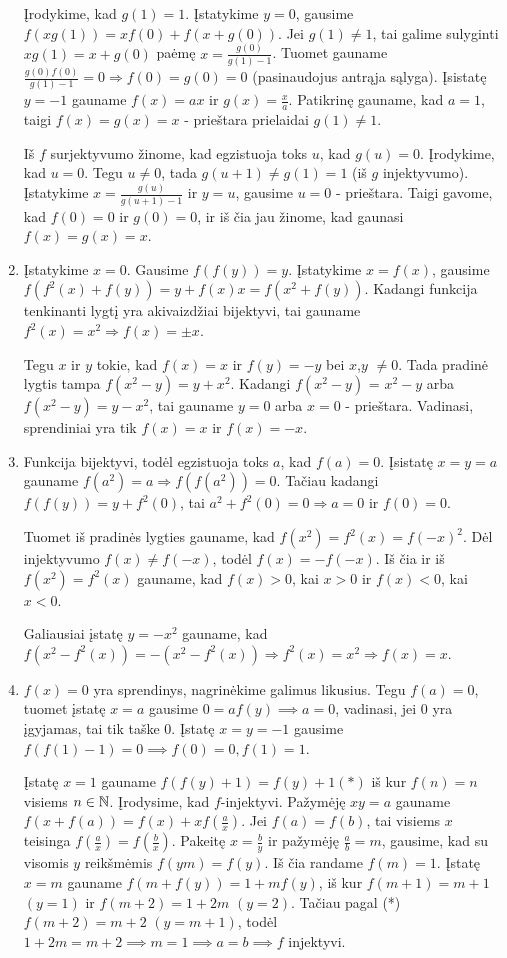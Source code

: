 \begin{enumerate}
Įrodykime, kad $g(1)=1$. Įstatykime $y = 0$, gausime $f(xg(1)) = xf(0)
+ f(x + g(0))$. Jei $g(1)\neq 1$, tai galime sulyginti $xg(1)=x+g(0)$
paėmę $x = \frac{g(0)}{g(1)-1}$. Tuomet gauname
$\frac{g(0)f(0)}{g(1)-1}=0 \Rightarrow f(0)=g(0)=0$ (pasinaudojus
antrąja sąlyga). Įsistatę $y = -1$ gauname $f(x)=ax$ ir
$g(x)=\frac{x}{a}$. Patikrinę gauname, kad $a =1$, taigi $f(x)=g(x)=x$
- prieštara prielaidai $g(1)\neq 1$.

Iš $f$ surjektyvumo žinome, kad egzistuoja toks $u$, kad $g(u)=0$.
Įrodykime, kad $u = 0$.  Tegu $u \neq 0$, tada $g(u+1)\neq g(1)=1$ (iš
$g$ injektyvumo).  Įstatykime $x = \frac{g(u)}{g(u+1)-1}$ ir $y = u$,
gausime $u = 0$ - prieštara.
Taigi gavome, kad $f(0)=0$ ir $g(0)=0$, ir iš čia jau žinome, kad
gaunasi $f(x)=g(x)=x$.
\item 
Įstatykime $x = 0$. Gausime $f(f(y))=y$. Įstatykime $x=f(x)$, gausime
$f(f^2(x) + f(y)) = y + f(x)x = f(x^2 + f(y))$. Kadangi funkcija
tenkinanti lygtį yra akivaizdžiai bijektyvi, tai gauname
$f^2(x)=x^2 \Rightarrow f(x)=\pm x$.

Tegu $x$ ir $y$ tokie, kad $f(x)=x$ ir $f(y)=-y$ bei $x$,$y$ $\neq 0$.
Tada pradinė lygtis tampa $f(x^2 - y)=y+x^2$. Kadangi $f(x^2-y)$ =
$x^2 - y$ arba $f(x^2-y) = y -x^2$, tai gauname $y=0$ arba $x = 0$ -
prieštara. Vadinasi, sprendiniai yra tik $f(x)=x$ ir $f(x)=-x$.
\item 
Funkcija bijektyvi, todėl egzistuoja toks $a$, kad $f(a)=0$. Įsistatę
$x=y=a$ gauname $f(a^2)=a \Rightarrow f(f(a^2))=0$. Tačiau kadangi
$f(f(y))=y + f^2(0)$, tai $a^2+f^2(0)=0 \Rightarrow a=0$ ir $f(0)=0$.

Tuomet iš pradinės lygties gauname, kad $f(x^2)=f^2(x)=f(-x)^2$. Dėl
injektyvumo $f(x)\neq f(-x)$, todėl $f(x)=-f(-x)$. Iš čia ir iš
$f(x^2)=f^2(x)$ gauname, kad $f(x)>0$, kai $x>0$ ir $f(x)<0$, kai
$x<0$.

Galiausiai įstatę $y=-x^2$ gauname, kad $f(x^2-f^2(x))=-(x^2-f^2(x))
\Rightarrow f^2(x)=x^2 \Rightarrow f(x)=x$.
\item 
$f(x)=0$ yra sprendinys, nagrinėkime galimus likusius. Tegu $f(a)=0$,
tuomet įstatę $x=a$ gausime $0=af(y) \implies a=0$, vadinasi, jei
$0$ yra įgyjamas, tai tik taške $0$. Įstatę $x=y=-1$ gausime
$f(f(1)-1)=0 \implies f(0)=0, f(1)=1$.

Įstatę $x=1$ gauname $f(f(y)+1)=f(y)+1(*)$ iš kur $f(n)=n$ visiems
$n\in \mathbb N$. Įrodysime, kad $f$-injektyvi. Pažymėję $xy=a$ gauname
$f(x+f(a))=f(x)+xf(\frac{a}{x})$. Jei $f(a)=f(b)$, tai visiems $x$
teisinga $f(\frac{a}{x}) = f(\frac{b}{x})$. Pakeitę $x=\frac{b}{y}$ ir pažymėję
$\frac{a}{b}=m$, gausime, kad su visomis $y$ reikšmėmis $f(ym)=f(y)$. Iš čia
randame $f(m)=1$. Įstatę $x=m$ gauname $f(m + f(y))=1+mf(y)$, iš kur
$f(m+1)=m+1$ $(y=1)$ ir $f(m+2)=1+2m$ $(y=2)$. Tačiau pagal (*)
$f(m+2)=m+2$ $(y=m+1)$, todėl $1+2m = m+2 \implies m=1 \implies
a=b \implies f$ injektyvi.


\end{enumerate}
